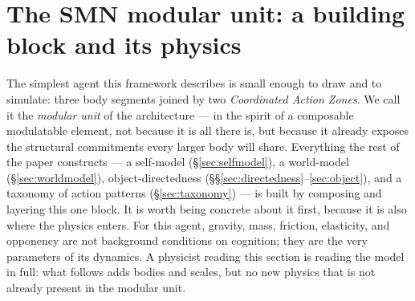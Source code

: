 \documentclass{article}
\begin{document}
\section{The SMN modular unit: a building block and its physics}\label{sec:atom}

The simplest agent this framework describes is small enough to draw
and to simulate: three body segments joined by two \emph{Coordinated
Action Zones}.  We call it the \emph{modular unit} of the architecture --- in
the spirit of a composable modulatable element, not because it is all
there is, but
because it already exposes the structural commitments every larger
body will share.  Everything the rest of the paper constructs --- a
self-model (\S\ref{sec:selfmodel}), a world-model
(\S\ref{sec:worldmodel}), object-directedness
(\S\S\ref{sec:directedness}--\ref{sec:object}), and a taxonomy of
action patterns (\S\ref{sec:taxonomy}) --- is built by composing and
layering this one block.  It is worth being concrete about it first,
because it is also where the physics enters.  For this agent, gravity,
mass, friction, elasticity, and opponency are not background
conditions on cognition; they are the very parameters of its
dynamics.  A physicist reading this section is reading the model in
full: what follows adds bodies and scales, but no new physics that is
not already present in the modular unit.
\end{document}
